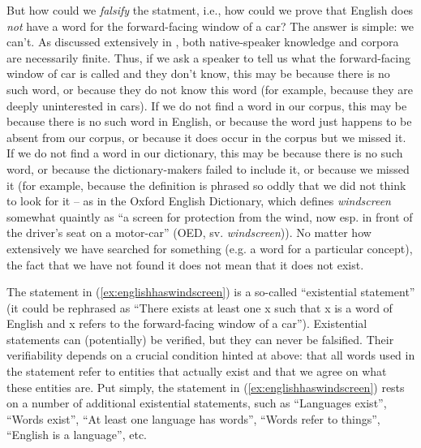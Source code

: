 But how could we \emph{falsify}  the statment, i.e., how could we prove that English does \emph{not} have a word for the forward\hyp{}facing window of a car? The answer is simple: we can't. As discussed extensively in , both native\hyp{}speaker knowledge and corpora are necessarily finite. Thus, if we ask a speaker to tell us what the forward\hyp{}facing window of car is called and they don't know, this may be because there is no such word, or because they do not know this word (for example, because they are deeply uninterested in cars). If we do not find a word in our corpus, this may be because there is no such word in English, or because the word just happens to be absent from our corpus, or because it does occur in the corpus but we missed it. If we do not find a word in our dictionary,  this may be because there is no such word, or because the dictionary\hyp{}makers  failed to include it, or because we missed it (for example, because the definition is phrased so oddly that we did not think to look for it -- as in the Oxford English Dictionary,  which defines \textit{windscreen} somewhat quaintly as ``a screen for protection from the wind, now esp. in front of the driver's seat on a motor\hyp{}car'' (OED, sv. \textit{windscreen})). No matter how extensively we have searched for something (e.g. a word for a particular concept), the fact that we have not found it does not mean that it does not exist.


The statement in (\ref{ex:englishhaswindscreen}) is a so\hyp{}called ``existential statement'' (it could be rephrased as ``There exists at least one x such that x is a word of English and x refers to the forward\hyp{}facing window of a car''). Existential statements can (potentially) be verified, but they can never be falsified.  Their verifiability depends on a crucial condition hinted at above: that all words used in the statement refer to entities that actually exist and that we agree on what these entities are. Put simply, the statement in (\ref{ex:englishhaswindscreen}) rests on a number of additional existential statements, such as ``Languages exist'', ``Words exist'', ``At least one language has words'', ``Words refer to things'', ``English is a language'', etc.

